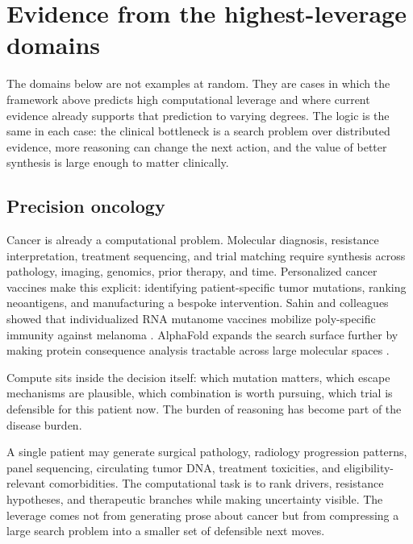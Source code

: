 \documentclass[11pt]{article}
\begin{document}
\section{Evidence from the highest-leverage domains}
The domains below are not examples at random. They are cases in which the framework above predicts high computational leverage and where current evidence already supports that prediction to varying degrees. The logic is the same in each case: the clinical bottleneck is a search problem over distributed evidence, more reasoning can change the next action, and the value of better synthesis is large enough to matter clinically.

\subsection{Precision oncology}
Cancer is already a computational problem. Molecular diagnosis, resistance interpretation, treatment sequencing, and trial matching require synthesis across pathology, imaging, genomics, prior therapy, and time. Personalized cancer vaccines make this explicit: identifying patient-specific tumor mutations, ranking neoantigens, and manufacturing a bespoke intervention. Sahin and colleagues showed that individualized RNA mutanome vaccines mobilize poly-specific immunity against melanoma \citep{sahin2017}. AlphaFold expands the search surface further by making protein consequence analysis tractable across large molecular spaces \citep{jumper2021}.

Compute sits inside the decision itself: which mutation matters, which escape mechanisms are plausible, which combination is worth pursuing, which trial is defensible for this patient now. The burden of reasoning has become part of the disease burden.

A single patient may generate surgical pathology, radiology progression patterns, panel sequencing, circulating tumor DNA, treatment toxicities, and eligibility-relevant comorbidities. The computational task is to rank drivers, resistance hypotheses, and therapeutic branches while making uncertainty visible. The leverage comes not from generating prose about cancer but from compressing a large search problem into a smaller set of defensible next moves.
\end{document}
